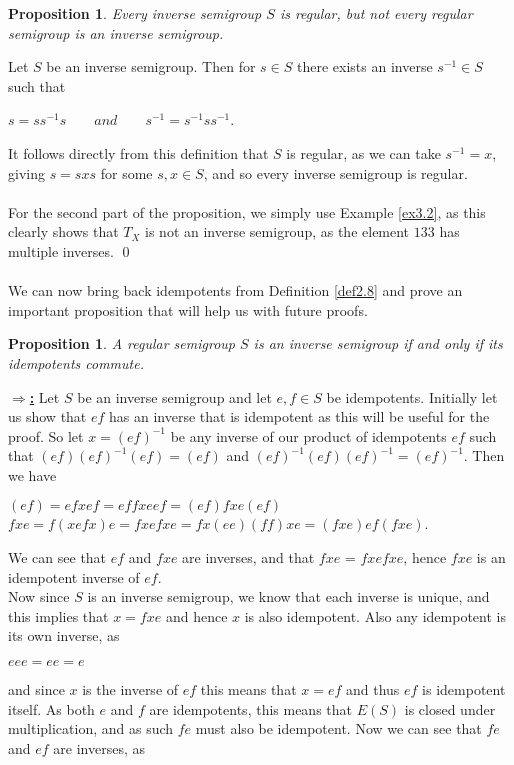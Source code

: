 \documentclass[12pt]{article}
\newtheorem{prop}[theorem]{Proposition}
\begin{document}
\begin{prop}
	Every inverse semigroup $S$ is regular, but not every regular semigroup is an inverse semigroup.
\end{prop}
\proof
	Let $S$ be an inverse semigroup. Then for $s \in S$ there exists an inverse $s^{-1} \in S$ such that
	\begin{center}
		$s=ss^{-1}s \qquad and \qquad s^{-1}=s^{-1}ss^{-1}$.
	\end{center}
	It follows directly from this definition that $S$ is regular, as we can take $s^{-1} = x$, giving $s=sxs$ for some $s,x \in S$, and so every inverse semigroup is regular.\\
	\\For the second part of the proposition, we simply use Example \ref{ex3.2}, as this clearly shows that $T_X$ is not an inverse semigroup, as the element $133$ has multiple inverses.
	\qed\\
\\We can now bring back idempotents from Definition \ref{def2.8} and prove an important proposition that will help us with future proofs.
\begin{prop}\label{prop3.4}
	A regular semigroup $S$ is an inverse semigroup if and only if its idempotents commute.
\end{prop}
\proof
	\textbf{\underline{$\Rightarrow$:}}
		Let $S$ be an inverse semigroup and let $e,f \in S$ be idempotents. Initially let us show that $ef$ has an inverse that is idempotent as this will be useful for the proof. So let $x=(ef)^{-1}$ be any inverse of our product of idempotents $ef$ such that $(ef)(ef)^{-1}(ef)=(ef)$ and $(ef)^{-1}(ef)(ef)^{-1}=(ef)^{-1}$. Then we have
		\begin{center}
			$(ef)=efxef=effxeef=(ef)fxe(ef)$\\[5mm]
			$fxe=f(xefx)e=fxefxe=fx(ee)(ff)xe=(fxe)ef(fxe)$.\\
		\end{center}
		We can see that $ef$ and $fxe$ are inverses, and that $fxe$ = $fxefxe$, hence $fxe$ is an idempotent inverse of $ef$.\\
		Now since $S$ is an inverse semigroup, we know that each inverse is unique, and this implies that $x=fxe$ and hence $x$ is also idempotent. Also any idempotent is its own inverse, as 
		\begin{center}
			$eee=ee=e$
		\end{center}
		and since $x$ is the inverse of $ef$ this means that $x = ef$ and thus $ef$ is idempotent itself. As both $e$ and $f$ are idempotents, this means that $E(S)$ is closed under multiplication, and as such $fe$ must also be idempotent. Now we can see that $fe$ and $ef$ are inverses, as
\end{document}
